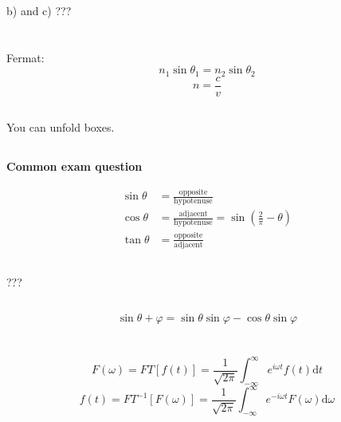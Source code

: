 \documentclass[12pt]{report}
\newcommand{\vphi}{\varphi}
\newcommand{\dd}{\mathrm{d}}
\newcommand{\exam}{\begin{center}
\textbf{Common exam question}
\end{center}}
\begin{document}
b) and c) ???

\section{}

\subsection{}
Fermat:
\[n_1\sin\theta_1=n_2\sin\theta_2\]
\[n=\frac{c}{v}\]

\subsection{}
You can unfold boxes.

\subsection{}
\exam
\begin{align*}
\sin\theta&=\mathrm{\frac{opposite}{hypotenuse}}\\
\cos\theta&=\mathrm{\frac{adjacent}{hypotenuse}}=\sin\left(\frac{2}{\pi}-\theta\right)\\
\tan\theta&=\mathrm{\frac{opposite}{adjacent}}
\end{align*}

\subsection{}
???

\subsection{}
\[\sin\theta+\vphi=\sin\theta\sin\vphi-\cos\theta\sin\vphi\]

\section{}

\subsection{}
\[F(\omega)=FT[f(t)]=\frac{1}{\sqrt{2\pi}}\int_{-\infty}^\infty e^{i\omega t}f(t)\dd t\]
\[f(t)=FT^{-1}[F(\omega)]=\frac{1}{\sqrt{2\pi}}\int_{-\infty}^\infty e^{-i\omega t}F(\omega)\dd\omega\]

\subsection{}
\end{document}
